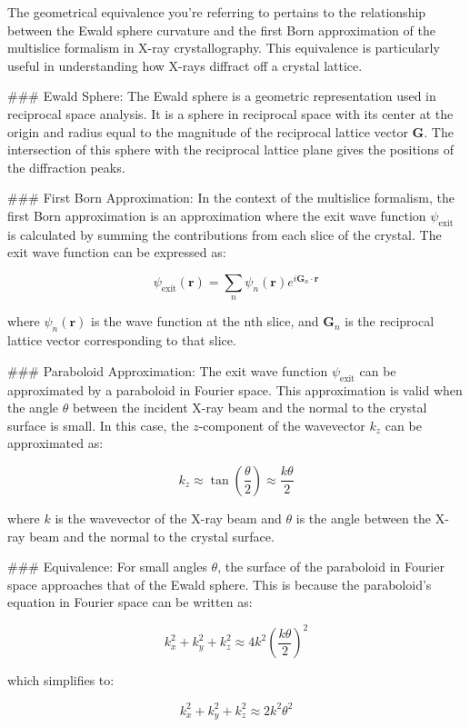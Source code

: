 The geometrical equivalence you're referring to pertains to the relationship between the Ewald sphere curvature and the first Born approximation of the multislice formalism in X-ray crystallography. This equivalence is particularly useful in understanding how X-rays diffract off a crystal lattice.

### Ewald Sphere:
The Ewald sphere is a geometric representation used in reciprocal space analysis. It is a sphere in reciprocal space with its center at the origin and radius equal to the magnitude of the reciprocal lattice vector \( \mathbf{G} \). The intersection of this sphere with the reciprocal lattice plane gives the positions of the diffraction peaks.

### First Born Approximation:
In the context of the multislice formalism, the first Born approximation is an approximation where the exit wave function \( \psi_{\text{exit}} \) is calculated by summing the contributions from each slice of the crystal. The exit wave function can be expressed as:

\[ \psi_{\text{exit}}(\mathbf{r}) = \sum_{n} \psi_n(\mathbf{r}) e^{i \mathbf{G}_n \cdot \mathbf{r}} \]

where \( \psi_n(\mathbf{r}) \) is the wave function at the nth slice, and \( \mathbf{G}_n \) is the reciprocal lattice vector corresponding to that slice.

### Paraboloid Approximation:
The exit wave function \( \psi_{\text{exit}} \) can be approximated by a paraboloid in Fourier space. This approximation is valid when the angle \( \theta \) between the incident X-ray beam and the normal to the crystal surface is small. In this case, the \( z \)-component of the wavevector \( k_z \) can be approximated as:

\[ k_z \approx \tan \left( \frac{\theta}{2} \right) \approx \frac{k \theta}{2} \]

where \( k \) is the wavevector of the X-ray beam and \( \theta \) is the angle between the X-ray beam and the normal to the crystal surface.

### Equivalence:
For small angles \( \theta \), the surface of the paraboloid in Fourier space approaches that of the Ewald sphere. This is because the paraboloid's equation in Fourier space can be written as:

\[ k_x^2 + k_y^2 + k_z^2 \approx 4 k^2 \left( \frac{k \theta}{2} \right)^2 \]

which simplifies to:

\[ k_x^2 + k_y^2 + k_z^2 \approx 2 k^2 \theta^2 \]

